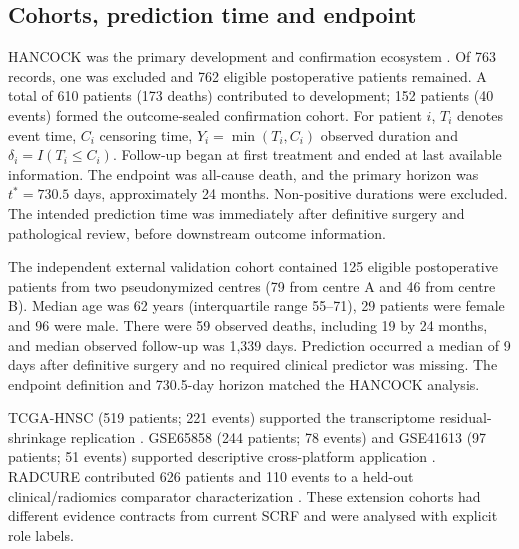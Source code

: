 \documentclass[pdflatex,sn-nature]{sn-jnl}
\begin{document}
\subsection{Cohorts, prediction time and endpoint}
HANCOCK was the primary development and confirmation ecosystem \cite{dorrich2025}. Of 763 records, one was excluded and 762 eligible postoperative patients remained. A total of 610 patients (173 deaths) contributed to development; 152 patients (40 events) formed the outcome-sealed confirmation cohort. For patient $i$, $T_i$ denotes event time, $C_i$ censoring time, $Y_i=\min(T_i,C_i)$ observed duration and $\delta_i=I(T_i\le C_i)$. Follow-up began at first treatment and ended at last available information. The endpoint was all-cause death, and the primary horizon was $t^*=730.5$ days, approximately 24 months. Non-positive durations were excluded. The intended prediction time was immediately after definitive surgery and pathological review, before downstream outcome information.

The independent external validation cohort contained 125 eligible postoperative patients from two pseudonymized centres (79 from centre A and 46 from centre B). Median age was 62 years (interquartile range 55--71), 29 patients were female and 96 were male. There were 59 observed deaths, including 19 by 24 months, and median observed follow-up was 1,339 days. Prediction occurred a median of 9 days after definitive surgery and no required clinical predictor was missing. The endpoint definition and 730.5-day horizon matched the HANCOCK analysis.

TCGA-HNSC (519 patients; 221 events) supported the transcriptome residual-shrinkage replication \cite{tcga2015,liu2018}. GSE65858 (244 patients; 78 events) and GSE41613 (97 patients; 51 events) supported descriptive cross-platform application \cite{wichmann2015,lohavanichbutr2013}. RADCURE contributed 626 patients and 110 events to a held-out clinical/radiomics comparator characterization \cite{welch2024}. These extension cohorts had different evidence contracts from current SCRF and were analysed with explicit role labels.
\end{document}
